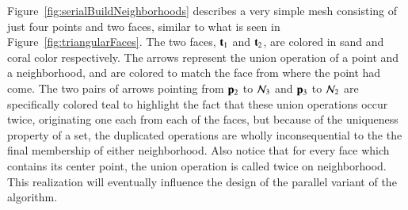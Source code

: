 Figure~\ref{fig:serialBuildNeighborhoods} describes a very simple mesh consisting of just four points and two faces, similar to what is seen in Figure~\ref{fig:triangularFaces}. The two faces, $\mathbf{t}_1$ and $\mathbf{t}_2$, are colored in sand and coral color respectively. The arrows represent the union operation of a point and a neighborhood, and are colored to match the face from where the point had come. The two pairs of arrows pointing from $\mathbf{p}_2$ to $\mathcal{N}_3$ and $\mathbf{p}_3$ to $\mathcal{N}_2$ are specifically colored teal to highlight the fact that these union operations occur twice, originating one each from each of the faces, but because of the uniqueness property of a set, the duplicated operations are wholly inconsequential to the the final membership of either neighborhood. Also notice that for every face which contains its center point, the union operation is called twice on neighborhood. This realization will eventually influence the design of the parallel variant of the algorithm.


